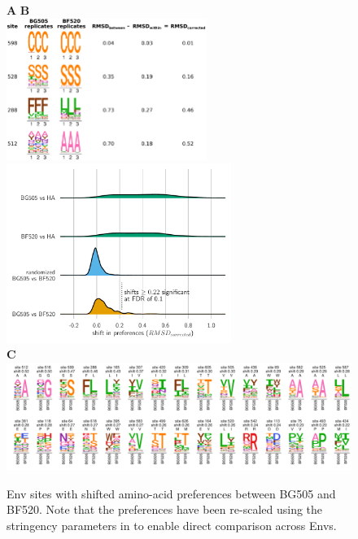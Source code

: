 \documentclass[9pt]{elife}
\begin{document}
\begin{figure}
\begin{fullwidth}
{\bf \Large A} \hspace{0.61\textwidth} {\bf \Large B} \\
\hspace{0.01\textwidth} 
\includegraphics[width=0.58\textwidth]{figures/prefs_distance/prefs_distance.pdf}
\hspace{0.03\textwidth}
\includegraphics[clip=true, trim=0in 0in 0in 0.4in, width=0.65\textwidth]{figures/distance_distribution.pdf}
\vspace{0.15in}
\\ 
{\bf \Large C} \\
\includegraphics[width=1.3\textwidth]{figures/shifted_sites.pdf}
\caption{\label{fig:prefsdist}
Env sites with shifted amino-acid preferences between BG505 and BF520.
Note that the preferences have been re-scaled using the stringency parameters in  to enable direct comparison across Envs.
}
\end{fullwidth}
\end{figure}
\end{document}
